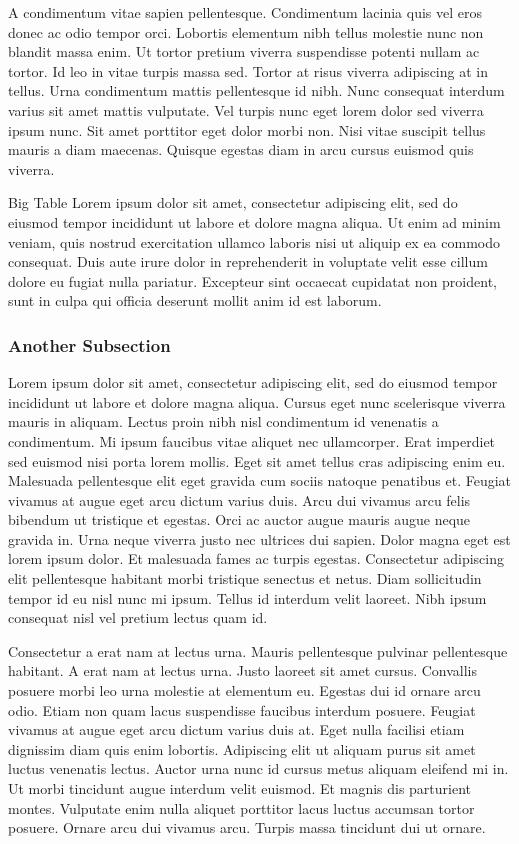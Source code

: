 \documentclass[red, openany, logo-1e]{shadowrun}
\begin{document}
A condimentum vitae sapien pellentesque. Condimentum lacinia quis vel eros donec ac odio tempor orci. Lobortis elementum nibh tellus molestie nunc non blandit massa enim. Ut tortor pretium viverra suspendisse potenti nullam ac tortor. Id leo in vitae turpis massa sed. Tortor at risus viverra adipiscing at in tellus. Urna condimentum mattis pellentesque id nibh. Nunc consequat interdum varius sit amet mattis vulputate. Vel turpis nunc eget lorem dolor sed viverra ipsum nunc. Sit amet porttitor eget dolor morbi non. Nisi vitae suscipit tellus mauris a diam maecenas. Quisque egestas diam in arcu cursus euismod quis viverra.

\begin{srbigtable}[htbp]{Big Table}
    Lorem ipsum dolor sit amet, consectetur adipiscing elit, sed do eiusmod tempor incididunt ut labore et dolore magna aliqua. Ut enim ad minim veniam, quis nostrud exercitation ullamco laboris nisi ut aliquip ex ea commodo consequat. Duis aute irure dolor in reprehenderit in voluptate velit esse cillum dolore eu fugiat nulla pariatur. Excepteur sint occaecat cupidatat non proident, sunt in culpa qui officia deserunt mollit anim id est laborum.
\end{srbigtable}

\subsubsection{Another Subsection}
Lorem ipsum dolor sit amet, consectetur adipiscing elit, sed do eiusmod tempor incididunt ut labore et dolore magna aliqua. Cursus eget nunc scelerisque viverra mauris in aliquam. Lectus proin nibh nisl condimentum id venenatis a condimentum. Mi ipsum faucibus vitae aliquet nec ullamcorper. Erat imperdiet sed euismod nisi porta lorem mollis. Eget sit amet tellus cras adipiscing enim eu. Malesuada pellentesque elit eget gravida cum sociis natoque penatibus et. Feugiat vivamus at augue eget arcu dictum varius duis. Arcu dui vivamus arcu felis bibendum ut tristique et egestas. Orci ac auctor augue mauris augue neque gravida in. Urna neque viverra justo nec ultrices dui sapien. Dolor magna eget est lorem ipsum dolor. Et malesuada fames ac turpis egestas. Consectetur adipiscing elit pellentesque habitant morbi tristique senectus et netus. Diam sollicitudin tempor id eu nisl nunc mi ipsum. Tellus id interdum velit laoreet. Nibh ipsum consequat nisl vel pretium lectus quam id.

Consectetur a erat nam at lectus urna. Mauris pellentesque pulvinar pellentesque habitant. A erat nam at lectus urna. Justo laoreet sit amet cursus. Convallis posuere morbi leo urna molestie at elementum eu. Egestas dui id ornare arcu odio. Etiam non quam lacus suspendisse faucibus interdum posuere. Feugiat vivamus at augue eget arcu dictum varius duis at. Eget nulla facilisi etiam dignissim diam quis enim lobortis. Adipiscing elit ut aliquam purus sit amet luctus venenatis lectus. Auctor urna nunc id cursus metus aliquam eleifend mi in. Ut morbi tincidunt augue interdum velit euismod. Et magnis dis parturient montes. Vulputate enim nulla aliquet porttitor lacus luctus accumsan tortor posuere. Ornare arcu dui vivamus arcu. Turpis massa tincidunt dui ut ornare.
\end{document}
